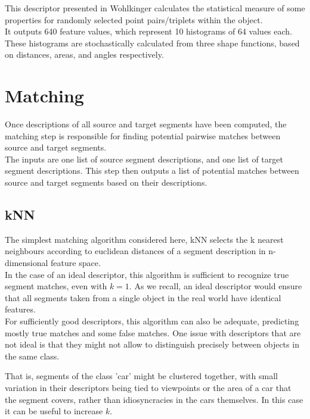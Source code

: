 This descriptor presented in Wohlkinger \cite{wohlkinger2011ensemble} calculates the statistical measure of some properties for randomly selected point pairs/triplets within the object.\\

It outputs 640 feature values, which represent 10 histograms of 64 values each. These histograms are stochastically calculated from three shape functions, based on distances, areas, and angles respectively.

\section{Matching}
\label{sec:matching}

Once descriptions of all source and target segments have been computed, the matching step is responsible for finding potential pairwise matches between source and target segments.\\ 

The inputs are one list of source segment descriptions, and one list of target segment descriptions. This step then outputs a list of potential matches between source and target segments based on their descriptions.\\

\subsection{kNN}
\label{subsec:kNN}

The simplest matching algorithm considered here, kNN selects the k nearest neighbours according to euclidean distances of a segment description in n-dimensional feature space.\\

In the case of an ideal descriptor, this algorithm is sufficient to recognize true segment matches, even with $k = 1$. As we recall, an ideal descriptor would ensure that all segments taken from a single object in the real world have identical features.\\ 

For sufficiently good descriptors, this algorithm can also be adequate, predicting mostly true matches and some false matches. One issue with descriptors that are not ideal is that they might not allow to distinguish precisely between objects in the same class.

That is, segments of the class 'car' might be clustered together, with small variation in their descriptors being tied to viewpoints or the area of a car that the segment covers, rather than idiosyncracies in the cars themselves. In this case it can be useful to increase $k$.\\


